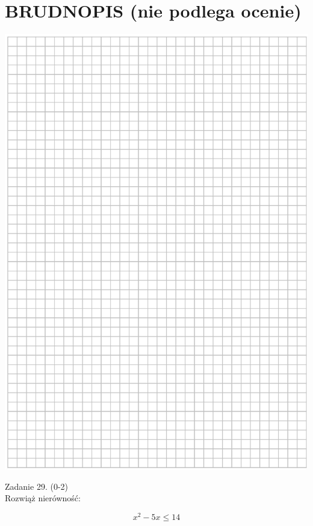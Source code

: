 \documentclass[10pt]{article}
\begin{document}
\section*{BRUDNOPIS (nie podlega ocenie)}
\begin{center}
\includegraphics[max width=\textwidth]{2024_11_21_46d945490f1b2eff1c8eg-15}
\end{center}

Zadanie 29. (0-2)\\
Rozwiąż nierówność:

\[
x^{2}-5 x \leq 14
\]
\end{document}
